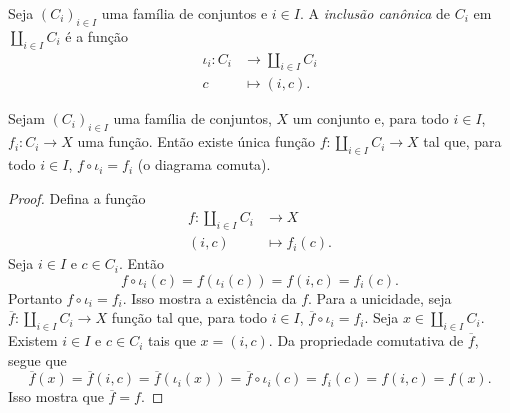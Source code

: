 \begin{defi}
Seja $(C_i)_{i \in I}$ uma família de conjuntos e $i \in I$. A \emph{inclusão canônica} de $C_i$ em $\coprod_{i \in I} C_i$ é a função
	\begin{align*}
	\iota_i: C_i &\to \coprod_{i \in I} C_i \\
			c &\mapsto (i,c).
	\end{align*}
\end{defi}

\begin{prop}
Sejam $(C_i)_{i \in I}$ uma família de conjuntos, $X$ um conjunto e, para todo $i \in I$, $f_i: C_i \to X$ uma função. Então existe única função $f: \coprod_{i \in I} C_i \to X$ tal que, para todo $i \in I$, $f \circ \iota_i = f_i$ (o diagrama comuta).
\begin{figure}[!h]
\centering
{}
\end{figure}
\end{prop}
\begin{proof}
Defina a função
	\begin{align*}
	f: \coprod_{i \in I} C_i &\to X \\
		(i,c) &\mapsto f_i(c).
	\end{align*}
Seja $i \in I$ e $c \in C_i$. Então
	\begin{equation*}
	f \circ \iota_i(c) = f(\iota_i(c)) = f(i,c) = f_i(c).
	\end{equation*}
Portanto $f \circ \iota_i = f_i$. Isso mostra a existência da $f$. Para a unicidade, seja $\overline{f}: \coprod_{i \in I} C_i \to X$ função tal que, para todo $i \in I$, $\overline{f} \circ \iota_i = f_i$. Seja $x \in \coprod_{i \in I} C_i$. Existem $i \in I$ e $c \in C_i$ tais que $x=(i,c)$. Da propriedade comutativa de $\overline{f}$, segue que
	\begin{equation*}
	\overline{f}(x) = \overline{f}(i,c) = \overline{f}(\iota_i(x)) = \overline{f} \circ \iota_i(c) = f_i(c) = f(i,c) = f(x).
	\end{equation*}
Isso mostra que $\overline{f}=f$.
\end{proof}


